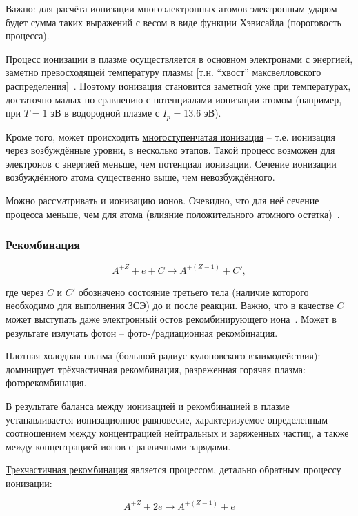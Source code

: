 \documentclass[10pt, a4paper]{article}
\numberwithin{equation}{section}
\begin{document}
Важно: для расчёта ионизации многоэлектронных атомов электронным ударом будет сумма таких выражений с весом в виде функции Хэвисайда (пороговость процесса).

Процесс ионизации в плазме осуществляется в основном электронами с энергией, заметно превосходящей температуру плазмы [т.н. ``хвост'' максвелловского распределения]~\cite{astap}. Поэтому ионизация становится заметной уже при температурах, достаточно малых по сравнению с потенциалами ионизации атомом (например, при $T=1$ эВ в водородной плазме с $I_p=13.6$ эВ).

Кроме того, может происходить \uline{многоступенчатая ионизация} -- т.е. ионизация через возбуждённые уровни, в несколько этапов. Такой процесс возможен для электронов с энергией меньше, чем потенциал ионизации. Сечение ионизации возбуждённого атома существенно выше, чем невозбуждённого. 

Можно рассматривать и ионизацию ионов. Очевидно, что для неё сечение процесса меньше, чем для атома (влияние положительного атомного остатка)~\cite{raizer}.

\subsubsection{Рекомбинация}

\begin{equation}
	A^{+Z} + e + C \rightarrow A^{+(Z-1)} + C',
\end{equation}

где через $C$ и $C'$ обозначено состояние третьего тела (наличие которого необходимо для выполнения ЗСЭ) до и после реакции. Важно, что в качестве $C$ может выступать даже электронный остов рекомбинирующего иона~\cite{astap}. Может в результате излучать фотон -- фото-/радиационная рекомбинация.

Плотная холодная плазма (большой радиус кулоновского взаимодействия): доминирует трёхчастичная рекомбинация, разреженная горячая плазма: фоторекомбинация.

В результате баланса между ионизацией и рекомбинацией в плазме устанавливается ионизационное равновесие, характеризуемое определенным соотношением между концентрацией нейтральных и заряженных частиц, а также между концентрацией
ионов с различными зарядами. 

\uline{Трехчастичная рекомбинация} является процессом, детально обратным процессу ионизации:

\begin{equation*}
	A^{+Z} + 2e \rightarrow A^{+(Z-1)} + e 
\end{equation*}
\end{document}
